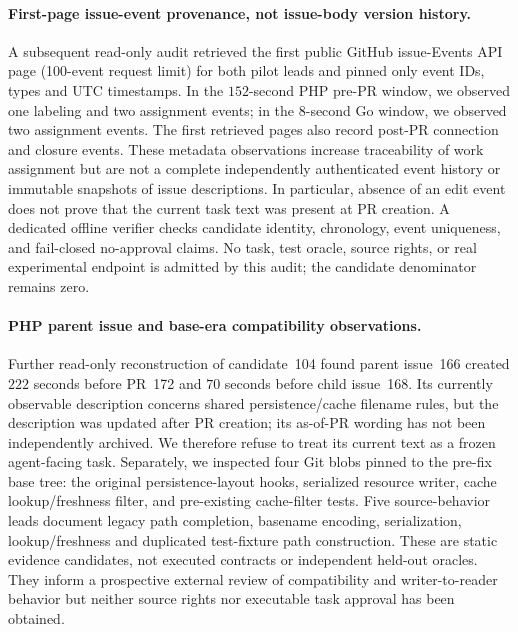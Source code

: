 \documentclass[pdflatex,sn-basic]{sn-jnl}
\begin{document}
\paragraph{First-page issue-event provenance, not issue-body version history.}
A subsequent read-only audit retrieved the first public GitHub
issue-Events API page (100-event request limit) for both pilot leads
and pinned only event IDs, types and UTC timestamps. In the
$152$-second PHP pre-PR window, we observed one labeling and two
assignment events; in the $8$-second Go window, we observed two
assignment events. The first retrieved pages also record post-PR
connection and closure events. These metadata observations increase
traceability of work assignment but are not a complete independently
authenticated event history or immutable snapshots of issue
descriptions. In particular, absence of an edit event does not prove
that the current task text was present at PR creation. A dedicated
offline verifier checks candidate identity, chronology, event
uniqueness, and fail-closed no-approval claims. No task, test oracle,
source rights, or real experimental endpoint is admitted by this
audit; the candidate denominator remains zero.

\paragraph{PHP parent issue and base-era compatibility observations.}
Further read-only reconstruction of candidate~104 found parent
issue~166 created $222$ seconds before PR~172 and $70$ seconds
before child issue~168. Its currently observable description
concerns shared persistence/cache filename rules, but the
description was updated after PR creation; its as-of-PR wording
has not been independently archived. We therefore refuse
to treat its current text as a frozen agent-facing task.
Separately, we inspected four Git blobs pinned to the pre-fix
base tree: the original persistence-layout hooks, serialized
resource writer, cache lookup/freshness filter, and
pre-existing cache-filter tests. Five source-behavior
leads document legacy path completion, basename encoding,
serialization, lookup/freshness and duplicated test-fixture
path construction. These are static evidence candidates,
not executed contracts or independent held-out oracles.
They inform a prospective external review of compatibility
and writer-to-reader behavior but neither source rights
nor executable task approval has been obtained.
\end{document}

